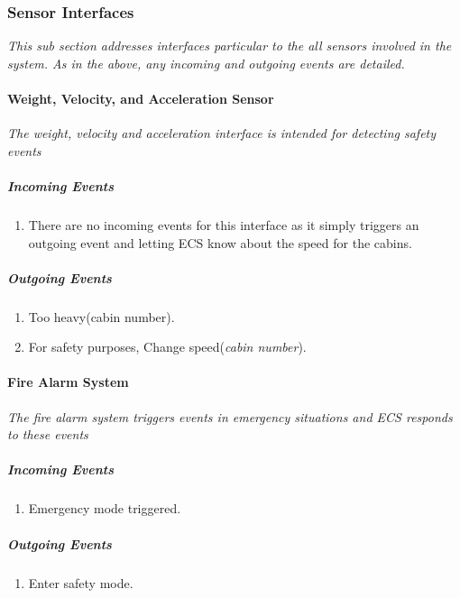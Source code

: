 \documentclass[12pt]{article}
\begin{document}
		
		\subsubsection{Sensor Interfaces}
		\textit{This sub section addresses interfaces particular to the all sensors involved
		in the system. As in the above, any incoming and outgoing events are detailed.}
		
			\paragraph{Weight, Velocity, and Acceleration Sensor}
			\textit{The weight, velocity and acceleration interface is intended for 
			detecting safety events}
				
				\subparagraph{Incoming Events}
					\begin{enumerate}
						\item There are no incoming events for this interface as it 
						simply triggers an outgoing event and letting ECS know about 
						the speed for the cabins.
					\end{enumerate}
				
				\subparagraph{Outgoing Events}
						\begin{enumerate}
						\item Too heavy(cabin number).
 						\item For safety purposes, Change speed(\textit{cabin number}).
					\end{enumerate}
			
			\paragraph{Fire Alarm System}
			\textit{The fire alarm system triggers events in emergency situations 
			and ECS responds to these events}
				\subparagraph{Incoming Events}
					\begin{enumerate}
						\item Emergency mode triggered.
					\end{enumerate}
				\subparagraph{Outgoing Events}
					\begin{enumerate}
						\item Enter safety mode.
					\end{enumerate}

			
\end{document}
